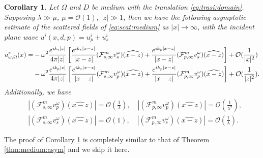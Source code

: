 \documentclass[a4paper,11pt]{article}
\newcommand{\mO}{\mathcal{O}}
\newtheorem{corollary}{Corollary}[section]
\theoremstyle{remark}
\theoremstyle{definition}
\numberwithin{equation}{section}
\begin{document}
\begin{corollary}\label{cor:asym:medium:shape:dete}
 Let $\Omega$ and $D$ be medium with the translation \eqref{eq:trasi:domain}. Supposing $\lambda  \gg \mu$, $ \mu = \mO(1)$, $|z| \gg 1$, then we
have the following asymptotic estimate of the scattered fields of \eqref{eq:scat:medium} as $|x| \rightarrow \infty$, with the incident plane wave $u^{i}(x,d,p)=u_{p}^i + u_{s}^i$
\begin{align}
 u_{\omega,\Omega}^s(x) =& -\omega^2\frac{e^{ik_s|z|}}{4 \pi |z|} \left[ \frac{e^{ik_s|x-z|}}{|x-z|} (\mathcal{F}^m_{s,\infty}v_{s}^\omega)(\widehat{x-z})   + \frac{e^{ik_p|x-z|}}{|x-z|}
(\mathcal{F}^m_{p,\infty}v_{s}^\omega)(\widehat{x-z}) \right] + \mathcal{O}(\frac{1}{|x|^2}) \\
   &-\omega^2\frac{e^{ik_p|z|}}{4 \pi |z|} \left[ \frac{e^{ik_s|x-z|}}{|x-z|}  (\mathcal{F}^m_{s,\infty}v_{p}^\omega)(\widehat{x-z}) + \frac{e^{ik_p|x-z|}}{|x-z|} (\mathcal{F}^m_{p,\infty}v_{p}^\omega)(\widehat{x-z})\right] + \mO(\frac{1}{|z|^2}). \notag
\end{align}
Additionally, we have
\begin{align*}
&|(\mathcal{F}^m_{s,\infty}v_{p}^\omega)(\widehat{x-z})| = \mO(\frac{1}{\lambda}), \quad |(\mathcal{F}^m_{p,\infty}v_{p}^\omega)(\widehat{x-z})| = \mO(\frac{1}{\lambda^2}), \\
&|(\mathcal{F}^m_{s,\infty}v_{s}^\omega)(\widehat{x-z})| = \mO(1), \quad  |(\mathcal{F}^m_{p,\infty}v_{s}^\omega)(\widehat{x-z})| = \mO(\frac{1}{\lambda}).
\end{align*}
\end{corollary}

The proof of Corollary \ref{cor:asym:medium:shape:dete} is completely similar to that of Theorem \ref{thm:medium:asym} and we skip it here.
\end{document}
